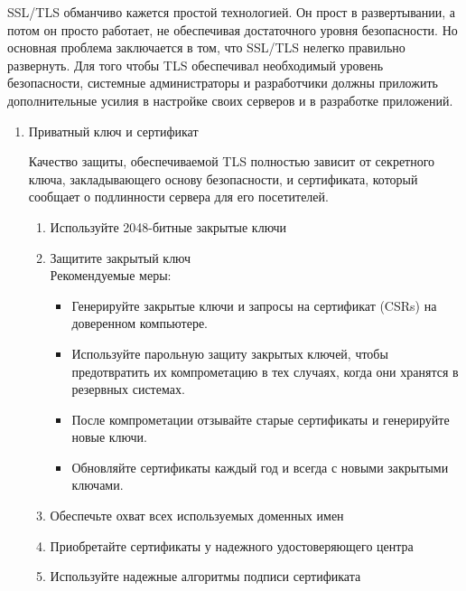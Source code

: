 \documentclass[10pt,a4paper]{report}
\begin{document}
SSL/TLS обманчиво кажется простой технологией. Он прост в развертывании, а потом он просто работает, не обеспечивая достаточного уровня безопасности. Но основная проблема заключается в том, что SSL/TLS нелегко правильно развернуть. Для того чтобы TLS обеспечивал необходимый уровень безопасности, системные администраторы и разработчики должны приложить дополнительные усилия в настройке своих серверов и в разработке приложений.
\begin{enumerate}
\item Приватный ключ и сертификат

Качество защиты, обеспечиваемой TLS полностью зависит от секретного ключа, закладывающего основу безопасности, и сертификата, который сообщает о подлинности сервера для его посетителей.   \\
\begin{enumerate}
\item Используйте 2048-битные закрытые ключи
\item Защитите закрытый ключ \\
 Рекомендуемые меры:
\begin{itemize}
\item Генерируйте закрытые ключи и запросы на сертификат (CSRs) на доверенном компьютере. \\
\item Используйте парольную защиту закрытых ключей, чтобы предотвратить их компрометацию в тех случаях, когда они хранятся в резервных системах. \\
\item После компрометации отзывайте старые сертификаты и генерируйте новые ключи. \\
\item Обновляйте сертификаты каждый год и всегда с новыми закрытыми ключами. \\
\end{itemize}
\item Обеспечьте охват всех используемых доменных имен
\item Приобретайте сертификаты у надежного удостоверяющего центра
\item Используйте надежные алгоритмы подписи сертификата 
\end{enumerate}


\end{enumerate}
\end{document}
